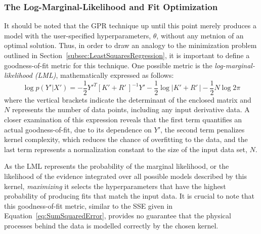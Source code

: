 \documentclass{article}
\begin{document}
\subsubsection{The Log-Marginal-Likelihood and Fit Optimization}
\label{subsubsec:LMLOptimization}

It should be noted that the GPR technique up until this point merely produces a model with the user-specified hyperparameters, $\theta$, without any metnion of an optimal solution. Thus, in order to draw an analogy to the minimization problem outlined in Section~\ref{subsec:LeastSquaresRegression}, it is important to define a goodness-of-fit metric for this technique. One possible metric is the \emph{log-marginal-likelihood (LML)}, mathematically expressed as follows:
\begin{equation}
\label{eq:LogMarginalLikelihood}
	\log{p\!\left(Y'|X'\right)} = -\frac{1}{2} Y'^T \left[K' + R'\,\right]^{-1} Y' - \frac{1}{2} \log{\left|K' + R'\,\right|} - \frac{1}{2} N \log{2\pi}
\end{equation}
where the vertical brackets indicate the determinant of the enclosed matrix and $N$ represents the number of data points, including any input derivative data. A closer examination of this expression reveals that the first term quantifies an actual goodness-of-fit, due to its dependence on $Y'$, the second term penalizes kernel complexity, which reduces the chance of overfitting to the data, and the last term represents a normalization constant to the size of the input data set, $N$.

As the LML represents the probability of the marginal likelihood, or the likelihood of the evidence integrated over all possible models described by this kernel, \emph{maximizing} it selects the hyperparameters that have the highest probability of producing fits that match the input data. It is crucial to note that this goodness-of-fit metric, similar to the SSE given in Equation~\eqref{eq:SumSquaredError}, provides no guarantee that the physical processes behind the data is modelled correctly by the chosen kernel.
\end{document}
